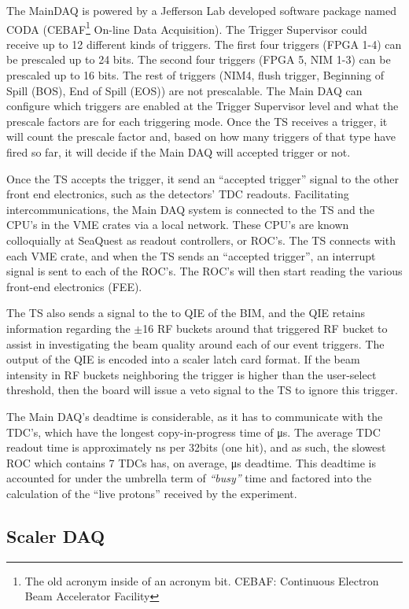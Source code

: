 The MainDAQ is powered by a Jefferson Lab developed software package named CODA (CEBAF\footnote{The old acronym inside of an acronym bit. CEBAF: Continuous Electron Beam Accelerator Facility} On-line Data Acquisition). The Trigger Supervisor could receive up to 12 different kinds of triggers. The first four triggers (FPGA 1-4) can be prescaled up to 24 bits. The second four triggers (FPGA 5, NIM 1-3) can be prescaled up to 16 bits. The rest of triggers (NIM4, flush trigger, Beginning of Spill (BOS), End of Spill (EOS)) are not prescalable. The Main DAQ can configure which triggers are enabled at the Trigger Supervisor level and what the  prescale factors are for each triggering mode. Once the TS receives a trigger, it will count the prescale factor and, based on how many triggers of that type have fired so far, it will decide if the Main DAQ will accepted trigger or not. 

Once the TS accepts the trigger, it send an ``accepted trigger'' signal to the other front end electronics, such as the detectors' TDC readouts. Facilitating intercommunications, the Main DAQ system is connected to the TS and the CPU's in the VME crates via a local network. These CPU's are known colloquially at SeaQuest as readout controllers, or ROC's. The TS connects with each VME crate, and when the TS sends an ``accepted trigger'', an interrupt signal is sent to each of the ROC's. The ROC's will then start reading the various front-end electronics (FEE).

The TS also sends a signal to the to QIE of the BIM, and the QIE retains information regarding the $\pm$16 RF buckets around that triggered RF bucket to assist in investigating the beam quality around each of our event triggers. The output of the QIE is encoded into a scaler latch card format. If the beam intensity in RF buckets neighboring the trigger is higher than the user-select threshold, then the board will issue a veto signal to the TS to ignore this trigger.

The Main DAQ's deadtime is considerable, as it has to communicate with the TDC's, which have the longest copy-in-progress time of \unit[32]{\us}. The average TDC readout time is approximately \unit[300]{ns} per 32bits (one hit), and as such, the slowest ROC which contains 7 TDCs has, on average, \unit[150]{\us} deadtime. This deadtime is accounted for under the umbrella term of \emph{``busy''} time and factored into the calculation of the ``live protons'' received by the experiment.

\subsection{Scaler DAQ}

